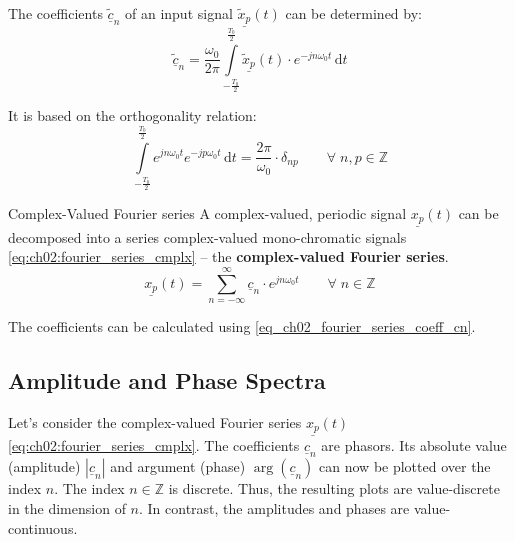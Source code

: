 \begin{refsection}
The coefficients $\underline{\tilde{c}}_n$ of an input signal $\underline{\tilde{x}_p}(t)$ can be determined by:
\begin{equation}
	\underline{\tilde{c}}_n = \frac{\omega_0}{2 \pi} \int\limits_{-\frac{T_0}{2}}^{\frac{T_0}{2}} \underline{\tilde{x}_p}(t) \cdot e^{-j n \omega_0 t} \, \mathrm{d} t
	\label{eq_ch02_fourier_series_coeff_cn}
\end{equation}

It is based on the orthogonality relation:
\begin{equation}
	\int\limits_{-\frac{T_0}{2}}^{\frac{T_0}{2}} e^{j n \omega_0 t} e^{-j p \omega_0 t} \, \mathrm{d} t = \frac{2 \pi}{\omega_0} \cdot \delta_{np} \qquad \forall \; n, p \in \mathbb{Z}
	\label{eq:ch02:orth_rel_exp}
\end{equation}

\vspace*{1em}

\begin{definition}{Complex-Valued Fourier series}
	A complex-valued, periodic signal $\underline{x_p}(t)$ can be decomposed into a series complex-valued mono-chromatic signals \eqref{eq:ch02:fourier_series_cmplx} -- the  \textbf{complex-valued Fourier series}.
	\begin{equation*}
		\underline{x_p}(t) = \sum\limits_{n = -\infty}^{\infty} \underline{c}_n \cdot e^{j n \omega_0 t} \qquad \forall \; n \in \mathbb{Z}
	\end{equation*}
	
	The coefficients can be calculated using \eqref{eq_ch02_fourier_series_coeff_cn}.
\end{definition}

\subsection{Amplitude and Phase Spectra}

Let's consider the complex-valued Fourier series $\underline{x_p}(t)$ \eqref{eq:ch02:fourier_series_cmplx}. The coefficients $\underline{c}_n$ are phasors. Its absolute value (amplitude) $|\underline{c}_n|$ and argument (phase) $\arg\left(\underline{c}_n\right)$ can now be plotted over the index $n$. The index $n \in \mathbb{Z}$ is discrete. Thus, the resulting plots are value-discrete in the dimension of $n$. In contrast, the amplitudes and phases are value-continuous.


\end{refsection}
